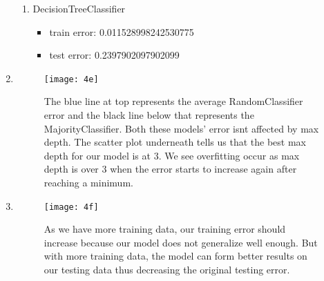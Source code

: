 \documentclass[11pt]{article}
\begin{document}
\begin{enumerate}
\begin{enumerate}
            \item DecisionTreeClassifier
            \begin{itemize}
                \item train error: 0.011528998242530775
                \item test error: 0.2397902097902099
            \end{itemize}
	
        \end{enumerate}
        
        \item 
            \begin{figure}[h]
                \centering
                \texttt{[image: 4e]}
                \caption{The blue line at top represents the average RandomClassifier error and the black line below that represents the MajorityClassifier. Both these models' error isnt affected by max depth. The scatter plot underneath tells us that the best max depth for our model is at 3. We see overfitting occur as max depth is over 3 when the error starts to increase again after reaching a minimum.}
            \end{figure}
        
        \newpage

        \item 
            \begin{figure}[h]
                \centering
                \texttt{[image: 4f]}
                \caption{As we have more training data, our training error should increase because our model does not generalize well enough. But with more training data, the model can form better results on our testing data thus decreasing the original testing error.}
            \end{figure}
        
    \end{enumerate}
\end{document}
